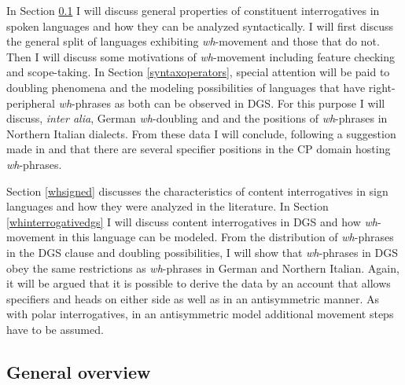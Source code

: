 In Section \ref{whgeneral} I will discuss general properties of constituent interrogatives in spoken languages and how they can be analyzed syntactically. I will first discuss the general split of languages exhibiting \textit{wh}-movement and those that do not. Then I will discuss some motivations of \textit{wh}-movement including feature checking and scope-taking. In Section \ref{syntaxoperators}, special attention will be paid to doubling phenomena and the modeling possibilities of languages that have right-peripheral \textit{wh}-phrases as both can be observed in DGS. For this purpose I will discuss, \textit{inter alia}, German \textit{wh}-doubling and and the positions of \textit{wh}-phrases in Northern Italian dialects. From these data I will conclude, following a suggestion made in \citet{aboh2010sa} and \citet{van2010complex, van2012you} that there are several specifier positions in the CP domain hosting \textit{wh}-phrases. 

Section \ref{whsigned} discusses the characteristics of content interrogatives in sign languages and how they were analyzed in the literature. In Section \ref{whinterrogativedgs} I will discuss content interrogatives in DGS and how \textit{wh}-movement in this language can be modeled. From the distribution of \textit{wh}-phrases in the DGS clause and doubling possibilities, I will show  that \textit{wh}-phrases in DGS obey the same restrictions as \textit{wh}-phrases in German and Northern Italian. Again, it will be argued that it is possible to derive the data by an account that allows specifiers and heads on either side as well as in an antisymmetric manner. As with polar interrogatives, in an antisymmetric model additional movement steps have to be assumed. 


\subsection{General overview}\label{whgeneral}
